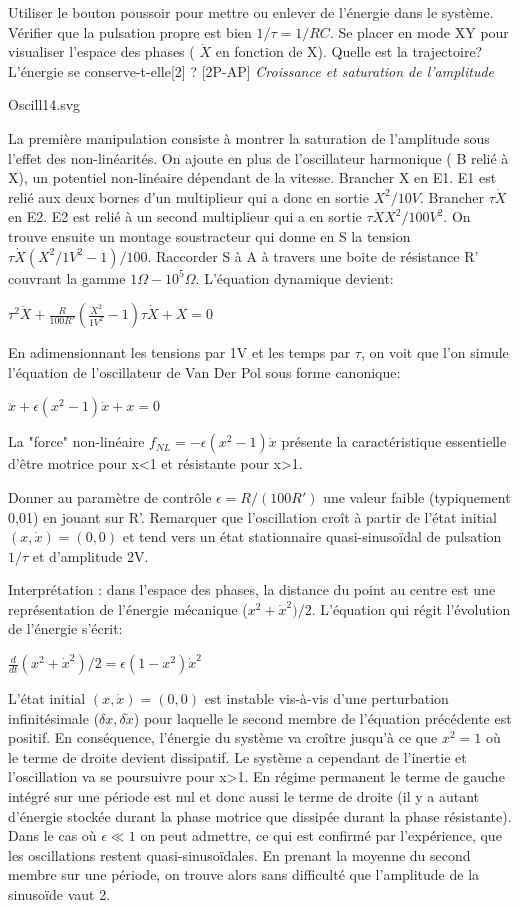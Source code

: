 \documentclass{article}%
\begin{document}
Utiliser le bouton poussoir pour mettre ou enlever de l'énergie dans le système. Vérifier que la pulsation propre est bien $1/\tau=1/RC$. Se placer en mode XY pour visualiser l'espace des phases ( $\dot X$ en fonction de X). Quelle est la trajectoire? L'énergie se conserve-t-elle[2] ?
[2P-AP] \textit{Croissance et saturation de l'amplitude}

Oscill14.svg

La première manipulation consiste à montrer la saturation de l'amplitude sous l'effet des non-linéarités. On ajoute en plus de l'oscillateur harmonique ( B relié à X), un potentiel non-linéaire dépendant de la vitesse. Brancher X en E1. E1 est relié aux deux bornes d'un multiplieur qui a donc en sortie $X^2/10V$. Brancher $\tau \dot X$ en E2. E2 est relié à un second multiplieur qui a en sortie $\tau \dot X X^2/100V^2$. On trouve ensuite un montage soustracteur qui donne en S la tension $\tau \dot X (X^2/1V^2-1)/100$. Raccorder S à A à travers une boite de résistance R' couvrant la gamme $1\Omega- 10^5\Omega$. L'équation dynamique devient:

    $ \tau^2 \ddot X+\frac{R}{100R'}\left(\frac{X^2}{1V^2}-1\right) \tau \dot X+X=0$

En adimensionnant les tensions par 1V et les temps par $\tau$, on voit que l'on simule l'équation de l'oscillateur de Van Der Pol sous forme canonique:

    $ \ddot x+\epsilon \left(x^2-1\right) \dot x+x=0$

La "force" non-linéaire $f_{NL} = -\epsilon (x^{2}-1)\dot x$ présente la caractéristique essentielle d'être motrice pour x<1 et résistante pour x>1.

Donner au paramètre de contrôle $\epsilon=R/(100R')$ une valeur faible (typiquement 0,01) en jouant sur R'. Remarquer que l'oscillation croît à partir de l'état initial $(x, \dot x) = (0,0)$ et tend vers un état stationnaire quasi-sinusoïdal de pulsation $1/\tau$ et d'amplitude 2V.

Interprétation : dans l'espace des phases, la distance du point au centre est une représentation de l'énergie mécanique ($x^2+\dot x^2)/2$. L'équation qui régit l'évolution de l'énergie s'écrit:

    $ \frac{d}{dt}(x^2+\dot x^2)/2=\epsilon \left(1-x^2\right) \dot x^2$

L'état initial $(x, \dot x) = (0,0)$ est instable vis-à-vis d'une perturbation infinitésimale ($\delta x, \delta \dot x$) pour laquelle le second membre de l'équation précédente est positif. En conséquence, l'énergie du système va croître jusqu'à ce que $x^2=1$ où le terme de droite devient dissipatif. Le système a cependant de l'inertie et l'oscillation va se poursuivre pour x>1. En régime permanent le terme de gauche intégré sur une période est nul et donc aussi le terme de droite (il y a autant d'énergie stockée durant la phase motrice que dissipée durant la phase résistante). Dans le cas où $\epsilon\ll 1$ on peut admettre, ce qui est confirmé par l'expérience, que les oscillations restent quasi-sinusoïdales. En prenant la moyenne du second membre sur une période, on trouve alors sans difficulté que l'amplitude de la sinusoïde vaut 2.
\end{document}
